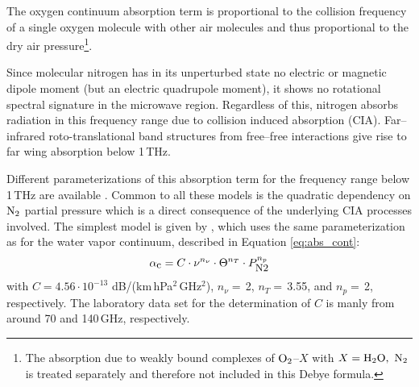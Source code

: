 The oxygen continuum absorption term is proportional to 
the collision frequency of a single oxygen molecule with other air molecules 
and thus proportional to the dry air pressure\footnote{The absorption
  due to weakly bound complexes of $\mbox{O}_2$--$X$ with $X=\mbox{H}_2\mbox{O},~\mbox{N}_2$ is 
  treated separately and therefore not included in this Debye formula.}.




\label{levelc:n2cont}
Since molecular nitrogen has in its unperturbed state no electric or 
magnetic dipole moment (but an electric quadrupole moment), it shows 
no rotational spectral signature in the microwave region. Regardless 
of this, nitrogen absorbs radiation in this frequency range due to 
collision induced absorption (CIA). Far--infrared roto-translational
band structures from free--free interactions give rise to far wing
absorption below 1\,THz.

Different parameterizations of this absorption term for the 
frequency range below 1\,THz are available 
\citet{pwr:93,liebeetal:93,borysow:86}. Common to all these 
models is the quadratic dependency on $\mbox{N}_2$ partial pressure which is 
a direct consequence of the underlying CIA processes involved.
The simplest model is given by \citet{pwr:93}, which uses 
the same parameterization as for the water vapor continuum, described 
in Equation \ref{eq:abs_cont}:
\begin{equation}
  \label{eq:abs_cont_pwr_n2}
    \alpha_{\mbox{\small c}} =  C \cdot \nu^{n_{\nu}} \cdot \Theta^{n_T} \cdot P_{\mbox{\rm \small N2}}^{n_p}
\end{equation}
with $C = 4.56\cdot 10^{-13}$ dB/(km\,hPa$^2$\,GHz$^2$), $n_{\nu}=$\,2, 
$n_T=$\,3.55, and $n_p=$\,2, respectively. The laboratory data set 
for the determination of $C$ is manly from \citet{dagg:75,dagg:78} 
around 70 and 140\,GHz, respectively.

